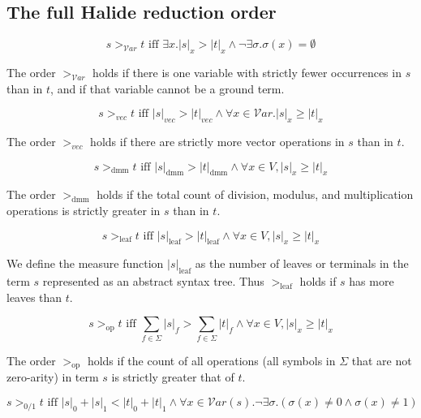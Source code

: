 \documentclass[acmsmall,review,anonymous]{acmart}\settopmatter{printfolios=true,printccs=false,printacmref=false}
\begin{document}
\subsection{The full Halide reduction order}
\label{a:reductionorder}

\begin{equation}
s >_{\mathcal{V}ar} t \textrm{ iff } \exists x . |s|_{x} > |t|_{x} \wedge \lnot \exists \sigma . \sigma(x) = \emptyset
\end{equation}

The order $>_{\mathcal{V}ar}$ holds if there is one variable with strictly fewer occurrences in $s$ than in $t$, and if that variable cannot be a ground term. 

\begin{equation}
s >_{vec} t \textrm{ iff } |s|_{vec} > |t|_{vec} \wedge \forall x \in \mathcal{V}ar . |s|_x \geq |t|_x
\end{equation}

The order $>_{vec}$ holds if there are strictly more vector operations in $s$ than in $t$.

\begin{equation}
s >_{\textrm{dmm}} t \textrm{ iff } |s|_{\textrm{dmm}} > |t|_{\textrm{dmm}} \wedge \forall x \in V, |s|_x \geq |t|_x
\end{equation}

The order $>_{\textrm{dmm}}$ holds if the total count of division, modulus, and multiplication operations is strictly greater in $s$ than in $t$.

\begin{equation}
s >_{\textrm{leaf}} t \textrm{ iff } |s|_{\textrm{leaf}} > |t|_{\textrm{leaf}} \wedge \forall x \in V, |s|_x \geq |t|_x
\end{equation}

We define the measure function $|s|_{\textrm{leaf}}$ as the number of leaves or terminals in the term $s$ represented as an abstract syntax tree. Thus $>_{\textrm{leaf}}$ holds if $s$ has more leaves than $t$.

\begin{equation}
s >_{\textrm{op}} t \textrm{ iff } \sum_{f \in \Sigma} |s|_f > \sum_{f \in \Sigma} |t|_f \wedge \forall x \in V, |s|_x \geq |t|_x
\end{equation}

The order $>_{\textrm{op}}$ holds if the count of all operations (all symbols in $\Sigma$ that are not zero-arity) in term $s$ is strictly greater that of $t$.

\begin{equation}
s >_{0/1} t \textrm{ iff } |s|_0 + |s|_1 < |t|_0 + |t|_1 \wedge \forall x \in \mathcal{V}ar(s) . \lnot \exists \sigma . (\sigma(x) \neq 0 \wedge \sigma(x) \neq 1)
\end{equation}
\end{document}
